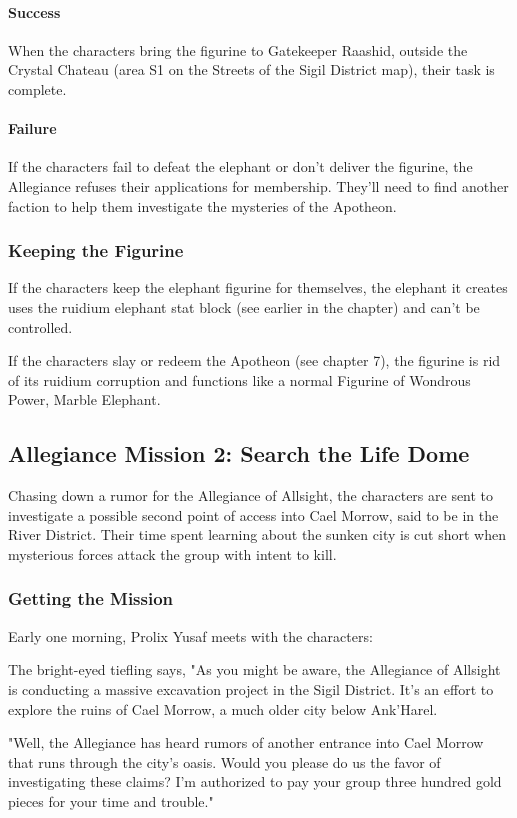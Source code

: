 \documentclass[10pt,a4paper,twoside,bg=print,twocolumn,openany,nodeprecatedcode]{dndbook}
\begin{document}
\paragraph{Success}
When the characters bring the figurine to Gatekeeper Raashid, outside the Crystal Chateau (area S1 on the Streets of the Sigil District map), their task is complete.

\paragraph{Failure}
If the characters fail to defeat the elephant or don't deliver the figurine, the Allegiance refuses their applications for membership. They'll need to find another faction to help them investigate the mysteries of the Apotheon.

\subsubsection{Keeping the Figurine}
If the characters keep the elephant figurine for themselves, the elephant it creates uses the ruidium elephant stat block (see earlier in the chapter) and can't be controlled.

If the characters slay or redeem the Apotheon (see chapter 7), the figurine is rid of its ruidium corruption and functions like a normal Figurine of Wondrous Power, Marble Elephant.

\subsection{Allegiance Mission 2: Search the Life Dome}
Chasing down a rumor for the Allegiance of Allsight, the characters are sent to investigate a possible second point of access into Cael Morrow, said to be in the River District. Their time spent learning about the sunken city is cut short when mysterious forces attack the group with intent to kill.

\subsubsection{Getting the Mission}
Early one morning, Prolix Yusaf meets with the characters:

\begin{DndReadAloud}{}
The bright-eyed tiefling says, "As you might be aware, the Allegiance of Allsight is conducting a massive excavation project in the Sigil District. It's an effort to explore the ruins of Cael Morrow, a much older city below Ank'Harel.

"Well, the Allegiance has heard rumors of another entrance into Cael Morrow that runs through the city's oasis. Would you please do us the favor of investigating these claims? I'm authorized to pay your group three hundred gold pieces for your time and trouble."

\end{DndReadAloud}
\end{document}
